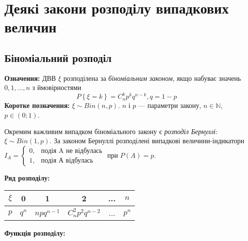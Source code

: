 \section{Деякі закони розподілу випадкових величин}

\subsection{Біноміальний розподіл}
\noindent\textbf{Означення:}
    ДВВ $\xi$ розподілена за \emph{біноміальним законом}, 
    якщо набуває значень $0,1,...,n$ з ймовірностями \begin{equation}
        P\left\{\xi = k\right\} = C_n^k p^k q^{n-k}, q = 1 - p
    \end{equation}
\textbf{Коротке позначення:} $\xi \sim {Bin}(n, p)$.
    $n$ і $p$ --- параметри закону, $n\in \mathbb{N}$, $p\in (0;1)$.

Окремим важливим випадком біноміального закону є \emph{розподіл Бернуллі}: $\xi \sim {Bin}(1, p)$.
За законом Бернуллі розподілені випадкові величини-індикатори $I_A = \begin{cases}
    0, & \text{подія A не відбулась}\\ 1, & \text{подія А відбулась}
\end{cases}$ при $P(A) = p$.

\noindent\textbf{Ряд розподілу:}

\begin{tabular}{c|c|c|c|c|c}
    $\xi$ & 0 & 1 & 2 & ... & $n$ \\
    \hline
    $p$ & $q^n$ & $npq^{n-1}$ & $C_n^2 p^2 q^{n-2}$ & ... & $p^n$
\end{tabular}

\noindent\textbf{Функція розподілу:}

